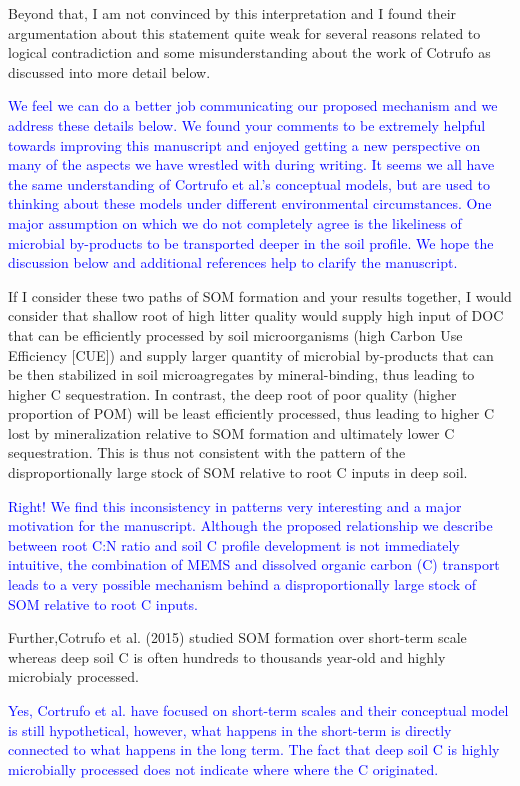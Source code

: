 \documentclass[]{article}
\begin{document}
Beyond that, I am not convinced by this interpretation and I found their
argumentation about this statement quite weak for several reasons
related to logical contradiction and some misunderstanding about the
work of Cotrufo as discussed into more detail below.

\textcolor{blue}{We feel we can do a better job communicating our proposed mechanism and we address these details below. We found your comments to be extremely helpful towards improving this manuscript and enjoyed getting a new perspective on many of the aspects we have wrestled with during writing. It seems we all have the same understanding of Cortrufo et al.'s conceptual models, but are used to thinking about these models under different environmental circumstances. One major assumption on which we do not completely agree is the likeliness of microbial by-products to be transported deeper in the soil profile. We hope the discussion below and additional references help to clarify the manuscript.}

If I consider these two paths of SOM formation and your results
together, I would consider that shallow root of high litter quality
would supply high input of DOC that can be efficiently processed by soil
microorganisms (high Carbon Use Efficiency {[}CUE{]}) and supply larger
quantity of microbial by-products that can be then stabilized in soil
microagregates by mineral-binding, thus leading to higher C
sequestration. In contrast, the deep root of poor quality (higher
proportion of POM) will be least efficiently processed, thus leading to
higher C lost by mineralization relative to SOM formation and ultimately
lower C sequestration. This is thus not consistent with the pattern of
the disproportionally large stock of SOM relative to root C inputs in
deep soil.

\textcolor{blue}{Right! We find this inconsistency in patterns very interesting and a major motivation for the manuscript. Although the proposed relationship we describe between root C:N ratio and soil C profile development is not immediately intuitive, the combination of MEMS and dissolved organic carbon (C) transport leads to a very possible mechanism behind a disproportionally large stock of SOM relative to root C inputs.}

Further,Cotrufo et al. (2015) studied SOM formation over short-term
scale whereas deep soil C is often hundreds to thousands year-old and
highly microbialy processed.

\textcolor{blue}{Yes, Cortrufo et al. have focused on short-term scales and their conceptual model is still hypothetical, however, what happens in the short-term is directly connected to what happens in the long term. The fact that deep soil C is highly microbially processed does not indicate where where the C originated.}
\end{document}
